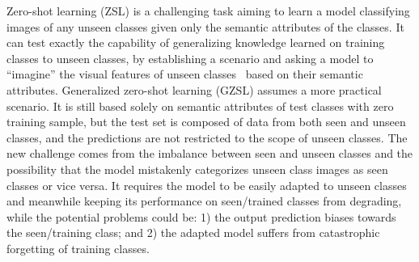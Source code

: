 \documentclass[letterpaper]{article} %
\begin{document}
Zero-shot learning (ZSL) is a challenging task aiming to learn a model classifying  images of any unseen classes given only the semantic attributes of the classes. It can test exactly the capability of generalizing knowledge learned on training classes to unseen classes, by establishing a scenario and asking a model to ``imagine'' the visual features of unseen classes~\cite{lampert2013attribute} based on their semantic attributes.
Generalized zero-shot learning (GZSL) assumes a more practical scenario. It is still based solely on semantic attributes of test classes with zero training sample, but the test set is composed of data from both seen and unseen classes, and the predictions are not restricted to the scope of unseen classes. The new challenge comes from the imbalance between seen and unseen classes and the possibility that the model mistakenly categorizes unseen class images as seen classes or vice versa. 
It requires the model to be easily adapted to unseen classes and meanwhile keeping its performance on seen/trained classes from degrading, while the potential problems could be: 1) the output prediction biases towards the seen/training class; and 2) the adapted model suffers from catastrophic forgetting of training classes.


\end{document}
